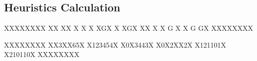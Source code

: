 \subsection{Heuristics Calculation}



XXXXXXXX
XX XX  X
X      X
XGX    X
XGX XX X
X    G X
X  G  GX
XXXXXXXX



XXXXXXXX
XX3XX65X
X123454X
X0X3443X
X0X2XX2X
X121101X
X210110X
XXXXXXXX

